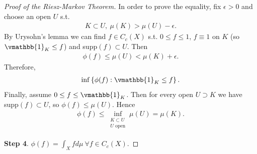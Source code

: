 \begin{proof}[Proof of the Riesz-Markov Theorem]
    In order to prove the equality, fix \(\epsilon>0\) and choose an open \(U\) s.t.
    \begin{align*}
        K\subset U, \ \mu(K)>\mu(U)-\epsilon.
    \end{align*}
    By Urysohn's lemma we can find \(f\in C_c(X)\) s.t. \(0\leq f\leq 1\), \(f\equiv 1\) on \(K\) (so \(\vmathbb{1}_K\leq f\)) and supp\((f)\subset U\). Then
    \begin{align*}
        \phi(f)\leq\mu(U)<\mu(K) + \epsilon.
    \end{align*}
    Therefore,
    \begin{align*}
        \inf\left\{\phi(f):\vmathbb{1}_K\leq f\right\}.
    \end{align*}
    Finally, assume \(0\leq f\leq\vmathbb{1}_K\). Then for every open \(U\supset K\) we have supp\((f)\subset U\), so \(\phi(f)\leq\mu(U)\). Hence
    \begin{align*}
        \phi(f) \leq \inf_{\substack{K\subset U \\ U \text{ open}}} \mu(U) = \mu(K).
    \end{align*}

    \textbf{Step 4}. \(\phi(f) = \int_X fd\mu\ \forall f\in C_c(X)\). 


\end{proof}
